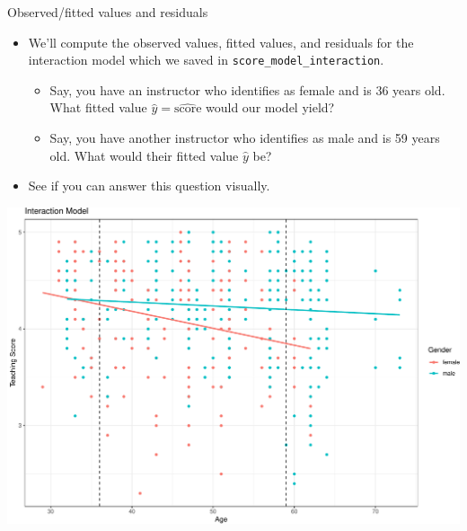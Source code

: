 \documentclass[
  ignorenonframetext,
]{beamer}
\providecommand{\tightlist}{%
  \setlength{\itemsep}{0pt}\setlength{\parskip}{0pt}}
\begin{document}
\begin{frame}[fragile]{Observed/fitted values and residuals}
\protect\hypertarget{observedfitted-values-and-residuals-1}{}
\begin{itemize}
\item
  We'll compute the observed values, fitted values, and residuals for
  the interaction model which we saved in
  \texttt{score\_model\_interaction}.

  \begin{itemize}
  \tightlist
  \item
    Say, you have an instructor who identifies as female and is 36 years
    old. What fitted value \(\hat{y}=\widehat{\text{score}}\) would our
    model yield?
  \item
    Say, you have another instructor who identifies as male and is 59
    years old. What would their fitted value \(\hat{y}\) be?
  \end{itemize}
\item
  See if you can answer this question visually.
\end{itemize}

\begin{center}\includegraphics[width=0.8\linewidth,height=0.45\textheight]{Week5_Lect_files/figure-beamer/unnamed-chunk-27-1} \end{center}
\end{frame}
\end{document}
